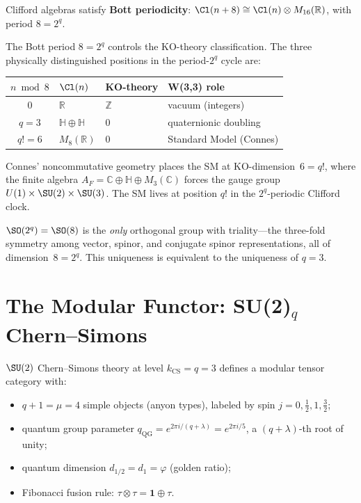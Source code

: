 Clifford algebras satisfy \textbf{Bott periodicity}:
$\Cl(n+8)\cong \Cl(n)\otimes M_{16}(\mathbb{R})$,
with period $8=2^q$.

\begin{theorem}
The Bott period $8=2^q$ controls the KO-theory classification.
The three physically distinguished positions in the period-$2^q$ cycle are:
\begin{center}
\begin{tabular}{@{}clll@{}}
\toprule
$n\bmod 8$ & $\Cl(n)$ & KO-theory & W(3,3) role \\
\midrule
$0$ & $\mathbb{R}$ & $\mathbb{Z}$ & vacuum (integers) \\
$q=3$ & $\mathbb{H}\oplus\mathbb{H}$ & $0$ & quaternionic doubling \\
$q!=6$ & $M_8(\mathbb{R})$ & $0$ & Standard Model (Connes) \\
\bottomrule
\end{tabular}
\end{center}
\end{theorem}

\noindent
Connes' noncommutative geometry places the SM at KO-dimension~$6 = q!$,
where the finite algebra $A_F = \mathbb{C}\oplus\mathbb{H}\oplus M_3(\mathbb{C})$
forces the gauge group $U(1)\times\SU(2)\times\SU(3)$.
The SM lives at position $q!$ in the $2^q$-periodic Clifford clock.

\begin{corollary}[Triality is Unique to $q=3$]
$\SO(2^q) = \SO(8)$ is the \emph{only} orthogonal group with triality---the
three-fold symmetry among vector, spinor, and conjugate spinor
representations, all of dimension~$8 = 2^q$.
This uniqueness is equivalent to the uniqueness of $q=3$.
\end{corollary}


\section{\texorpdfstring{The Modular Functor: SU(2)${}_q$ Chern--Simons}{The Modular Functor: SU(2) at level q Chern-Simons}}
\label{sec:modular-functor}

$\SU(2)$ Chern--Simons theory at level $k_{\mathrm{CS}}=q=3$
defines a modular tensor category with:
\begin{itemize}[nosep]
\item $q+1 = \mu = 4$ simple objects (anyon types),
  labeled by spin $j=0,\tfrac{1}{2},1,\tfrac{3}{2}$;
\item quantum group parameter $q_{\mathrm{QG}} = e^{2\pi i/(q+\lambda)} = e^{2\pi i/5}$,
  a $(q{+}\lambda)$-th root of unity;
\item quantum dimension $d_{1/2} = d_1 = \varphi$ (golden ratio);
\item Fibonacci fusion rule: $\tau\otimes\tau = \mathbf{1}\oplus\tau$.
\end{itemize}

